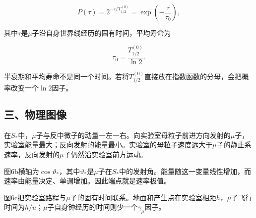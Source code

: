 \documentclass[12pt,a4paper,fontset=fandol]{ctexart}
\begin{document}
\[
P(\tau)=2^{-\tau/T_{1/2}^{(0)}}
=\exp\left(-\frac{\tau}{\tau_0}\right),
\]

其中\(\tau\)是\(\mu\)子沿自身世界线经历的固有时间，平均寿命为

\[
\boxed{\tau_0=\frac{T_{1/2}^{(0)}}{\ln2}}.
\]

半衰期和平均寿命不是同一个时间。若将\(T_{1/2}^{(0)}\)直接放在指数函数的分母，会把概率改变一个\(\ln2\)因子。

\subsection{三、物理图像}\label{ux4e09ux7269ux7406ux56feux50cf-5}

在\(S_*\)中，\(\mu\)子与反中微子的动量一左一右。向实验室母粒子前进方向发射的\(\mu\)子，实验室能量最大；反向发射的能量最小。实验室的母粒子速度远大于\(\mu\)子的静止系速率，反向发射的\(\mu\)子仍然沿实验室前方运动。

\begin{center}
\begin{minipage}{\linewidth}
\centering\begingroup{}
\ifdim\wd\diagrambox>.88\linewidth
\sbox{\diagrambox}{\resizebox{.88\linewidth}{!}{\usebox{\diagrambox}}}\fi
\ifdim\ht\diagrambox>.38\textheight
\resizebox{!}{.38\textheight}{\usebox{\diagrambox}}
\else\usebox{\diagrambox}\fi
\par{}\endgroup\end{minipage}\end{center}

图6b横轴为\(\cos\vartheta_*\)，其中\(\vartheta_*\)是\(\mu\)子在\(S_*\)中的发射角。能量随这一变量线性增加，而速率由能量决定、单调增加。因此端点就是速率极值。

图6c把实验室路程与\(\mu\)子的固有时间联系。地面和产生点在实验室相距\(h\)，\(\mu\)子飞行时间为\(h/u\)；\(\mu\)子自身钟经历的时间则少一个\(\gamma_\mu\)因子。
\end{document}
